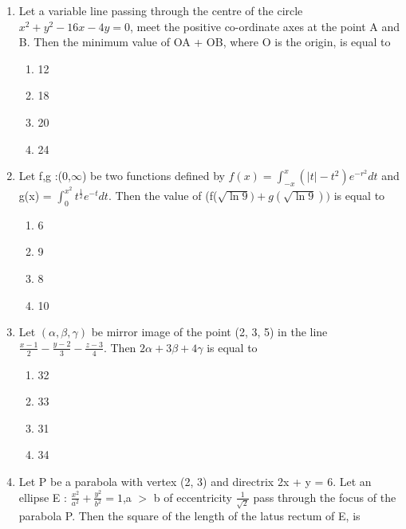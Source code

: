 \documentclass[journal]{IEEEtran}
\numberwithin{equation}{enumi}
\numberwithin{figure}{enumi}
\begin{document}
\begin{enumerate}
    \item Let a variable line passing through the centre of the circle $x^2  + y^2 - 16x - 4y = 0$, meet the positive co-ordinate axes at the point A and B. Then the minimum value of OA + OB, where O is the origin, is equal to
    \begin{multicols}{4}
    \begin{enumerate}
        \item 12
        \item 18
        \item 20
        \item 24
    \end{enumerate} 
    \end{multicols}
    \bigskip
    \item Let f,g :(0,$\infty$) be two functions defined by $f(x) = \int_{-x}^{x}(|t| - t^2)e^{-r^{2}}dt$ and g(x) = $\int_{0}^{x^2}t^{\frac{1}{2}}e^{-t}dt$. Then the value of (f($\sqrt{\ln9}) + g(\sqrt{\ln9}))$ is equal to
    \begin{multicols}{4}
    \begin{enumerate}
        \item 6
        \item 9
        \item 8
        \item 10
    \end{enumerate} 
    \end{multicols}
    \bigskip
    \item Let $(\alpha,\beta,\gamma)$  be mirror image of the point (2, 3, 5) in the line $\frac{x - 1}{2} - \frac{y - 2}{3} - \frac{z - 3}{4}$. Then $2\alpha + 3\beta + 4\gamma$ is equal to
    \begin{multicols}{4}
    \begin{enumerate}
        \item 32
        \item 33
        \item 31
        \item 34
    \end{enumerate} 
    \end{multicols}
    \bigskip
    \item Let P be a parabola with vertex (2, 3) and directrix 2x + y = 6. Let an ellipse E : $\frac{x^2}{a^2} + \frac{y^2}{b^2} = 1$,a $>$ b of eccentricity $\frac{1}{\sqrt{2}}$ pass through the focus of the parabola P. Then the square of the length of the latus rectum of E, is  
    \begin{multicols}{4}

\end{multicols}
\end{enumerate}
\end{document}
